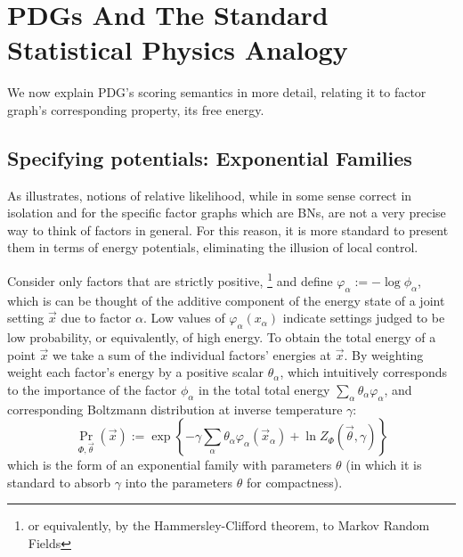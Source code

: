 

\section{PDGs And The Standard Statistical Physics Analogy}
We now explain PDG's scoring semantics in more detail, relating it to factor graph's corresponding property, its free energy.

\subsection{Specifying potentials: Exponential Families}\label{sec:fg-expfam}

As  illustrates, notions of relative likelihood, while in some sense correct in isolation and for the specific factor graphs which are BNs, are not a very precise way to think of factors in general. 
For this reason, it is more standard to present them in terms of energy potentials, eliminating the illusion of local control. 

Consider only factors that are strictly positive,%
	\footnote{or equivalently, by the Hammersley-Clifford theorem, to Markov Random Fields}
and define $ \varphi_\alpha := -\log \phi_\alpha$, which is can be thought of the additive component of the energy state of a joint setting $\vec x$ due to factor $\alpha$. 
Low values of $\varphi_\alpha(x_\alpha)$ indicate settings judged to be low probability, or equivalently, of high energy. 
To obtain the total energy of a point $\vec x$ we take a sum of the individual factors' energies at $\vec x$. By weighting weight each factor's energy by a positive scalar $\theta_\alpha$, which intuitively corresponds to the importance of the factor $\phi_\alpha$ in the total total energy $\sum_\alpha \theta_\alpha \varphi_\alpha$,
and corresponding Boltzmann distribution at inverse temperature $\gamma$:
\[ \Pr_{\Phi, \vec\theta} (\vec x)  := \exp \left\{ -\gamma \sum_\alpha \theta_\alpha \varphi_\alpha(\vec x_\alpha)  + \ln Z_\Phi(\vec \theta, \gamma) \right\} \] 
which is the form of an exponential family with parameters $\theta$ (in which it is standard to absorb $\gamma$ into the parameters $\theta$ for compactness).

